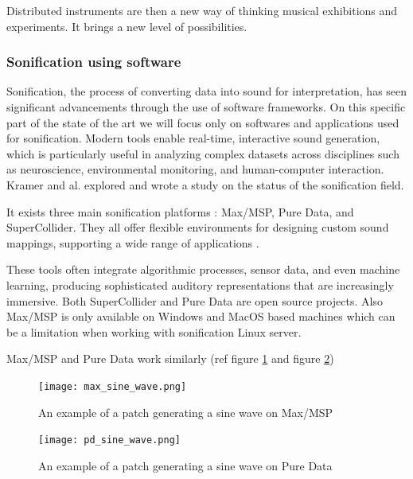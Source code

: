 
Distributed instruments are then a new way of thinking musical exhibitions and experiments. It brings a new level of possibilities.





\subsubsection{Sonification using software}

Sonification, the process of converting data into sound for interpretation, has seen significant advancements through the use of software frameworks. On this specific part of the state of the art we will focus only on softwares and applications used for sonification. Modern tools enable real-time, interactive sound generation, which is particularly useful in analyzing complex datasets across disciplines such as neuroscience, environmental monitoring, and human-computer interaction. Kramer and al. \cite{kramerSonificationReportStatusb} explored and wrote a study on the status of the sonification field.

It exists three main sonification platforms : Max/MSP, Pure Data, and SuperCollider. They all offer flexible environments for designing custom sound mappings, supporting a wide range of applications \cite{puckettePureDataAnother}\cite{mccartneyRethinkingComputerMusic2002}. 

These tools often integrate algorithmic processes, sensor data, and even machine learning, producing sophisticated auditory representations that are increasingly immersive. 
Both SuperCollider and Pure Data are open source projects. Also Max/MSP is only available on Windows and MacOS based machines which can be a limitation when working with sonification Linux server.

Max/MSP and Pure Data work similarly (ref figure \ref{fig:max_sine_wave} and figure \ref{fig:pd_sine_wave})

\begin{figure}[h]
    \centering
    \texttt{[image: max\_sine\_wave.png]}
    \caption{An example of a patch generating a sine wave on Max/MSP} 
    \vspace{0.1cm}
    \label{fig:max_sine_wave}
\end{figure}
\begin{figure}[h]
    \centering
    \texttt{[image: pd\_sine\_wave.png]}
    \caption{An example of a patch generating a sine wave on Pure Data} 
    \vspace{0.1cm}
    \label{fig:pd_sine_wave}
\end{figure}

